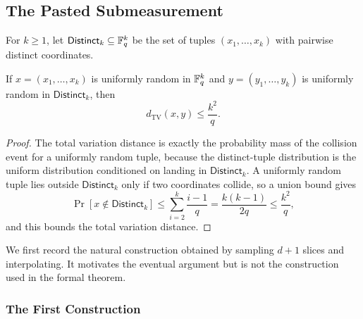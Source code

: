 \subsection{The Pasted Submeasurement}

\begin{definition}\label{def:distinct-tuples}
	\leanok
	For $k \ge 1$, let $\mathsf{Distinct}_k \subseteq \mathbb{F}_q^k$ be the set of tuples $(x_1,\dots,x_k)$ with pairwise distinct coordinates.
\end{definition}

\begin{proposition}\label{prop:ld-dnoteq}
	\leanok
	If $x=(x_1,\dots,x_k)$ is uniformly random in $\mathbb{F}_q^k$ and $y=(y_1,\dots,y_k)$ is uniformly random in $\mathsf{Distinct}_k$, then
	\[
		d_{\mathrm{TV}}(x,y) \le \frac{k^2}{q}.
	\]
\end{proposition}
\begin{proof}
	\leanok
	The total variation distance is exactly the probability mass of the collision
	event for a uniformly random tuple, because the distinct-tuple distribution is
	the uniform distribution conditioned on landing in $\mathsf{Distinct}_k$.
	A uniformly random tuple lies outside $\mathsf{Distinct}_k$ only if two
	coordinates collide, so a union bound gives
	\[
		\Pr[x \notin \mathsf{Distinct}_k] \le \sum_{i=2}^k \frac{i-1}{q} = \frac{k(k-1)}{2q}\le \frac{k^2}{q},
	\]
	and this bounds the total variation distance.
\end{proof}

We first record the natural construction obtained by sampling $d+1$ slices and interpolating. It motivates the eventual argument but is not the construction used in the formal theorem.

\subsubsection{The First Construction}\label{sec:first-construction}

